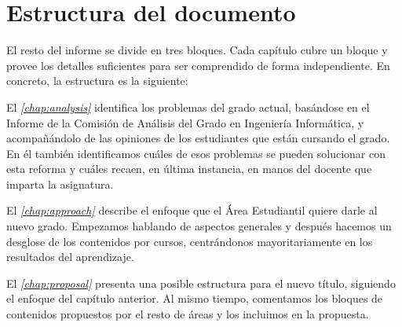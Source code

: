 \section{Estructura del documento}

El resto del informe se divide en tres bloques.
Cada capítulo cubre un bloque y provee los detalles suficientes para
ser comprendido de forma independiente.
En concreto, la estructura es la siguiente:

El \emph{\cref{chap:analysis}} identifica los problemas del grado actual,
basándose en
el Informe de la Comisión de Análisis del Grado en Ingeniería Informática,
y acompañándolo de las opiniones de los estudiantes que están cursando el grado.
En él también identificamos
cuáles de esos problemas se pueden solucionar con esta reforma y
cuáles recaen, en última instancia,
en manos del docente que imparta la asignatura.

El \emph{\cref{chap:approach}} describe el enfoque que el Área Estudiantil
quiere darle al nuevo grado.
Empezamos hablando de aspectos generales y después
hacemos un desglose de los contenidos por cursos,
centrándonos mayoritariamente en los resultados del aprendizaje.

El \emph{\cref{chap:proposal}} presenta una posible estructura
para el nuevo título,
siguiendo el enfoque del capítulo anterior.
Al mismo tiempo, comentamos los bloques de contenidos
propuestos por el resto de áreas
y los incluimos en la propuesta.
